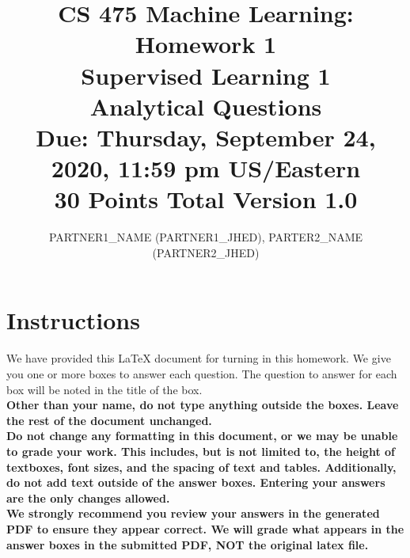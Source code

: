 \documentclass[11pt]{article}
\title{CS 475 Machine Learning: Homework 1\\
Supervised Learning 1\\
Analytical Questions\\
\Large{Due: Thursday, September 24, 2020, 11:59 pm US/Eastern}\\
30 Points Total \hspace{1cm} Version 1.0}
\author{PARTNER1\_NAME (PARTNER1\_JHED), PARTER2\_NAME (PARTNER2\_JHED)}
\date{}
\begin{document}
\maketitle
\thispagestyle{headings}


\section*{Instructions }
We have provided this \LaTeX{} document for turning in this homework. We give you one or more boxes to answer each question.  The question to answer for each box will be noted in the title of the box.\\

{\bf Other than your name, do not type anything outside the boxes. Leave the rest of the document unchanged.}\\


\textbf{Do not change any formatting in this document, or we may be unable to
  grade your work. This includes, but is not limited to, the height of
  textboxes, font sizes, and the spacing of text and tables.  Additionally, do
  not add text outside of the answer boxes. Entering your answers are the only
  changes allowed.}\\


\textbf{We strongly recommend you review your answers in the generated PDF to
  ensure they appear correct. We will grade what appears in the answer boxes in
  the submitted PDF, NOT the original latex file.}

\pagebreak
\end{document}
